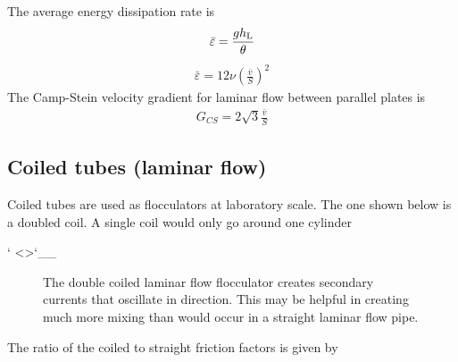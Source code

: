 \documentclass[letterpaper,10pt,english]{sphinxmanual}
\let\sphinxpxdimen\pdfpxdimen\else\newdimen\sphinxpxdimen
\begin{document}
The average energy dissipation rate is
\begin{equation}\label{equation:Rapid_Mix/RM_Derivations:Rapid_Mix/RM_Derivations:86}
\begin{split}\bar\varepsilon = \frac{gh_{\rm{L}}}{\theta}\end{split}
\end{equation}\begin{equation}\label{equation:Rapid_Mix/RM_Derivations:Rapid_Mix/RM_Derivations:87}
\begin{split}\bar\varepsilon = 12 \nu \left(\frac{  \bar v}{S} \right)^2\end{split}
\end{equation}
The Camp-Stein velocity gradient for laminar flow between parallel plates is
\begin{equation}\label{equation:Rapid_Mix/RM_Derivations:Rapid_Mix/RM_Derivations:88}
\begin{split}G_{CS} = 2\sqrt{3}\frac{  \bar v}{S}\end{split}
\end{equation}

\subsection{Coiled tubes (laminar flow)}
\label{\detokenize{Rapid_Mix/RM_Derivations:coiled-tubes-laminar-flow}}\label{\detokenize{Rapid_Mix/RM_Derivations:heading-coiled-tubes-laminar-flow}}
Coiled tubes are used as flocculators at laboratory scale. The one shown below is a doubled coil. A single coil would only go around one cylinder

{}` \textless{}\textgreater{}{}`\_\_

\begin{figure}[htbp]
\centering
\capstart

\noindent\sphinxincludegraphics[width=500\sphinxpxdimen]{{Coiled_tube_flocculator}.jpg}
\caption{The double coiled laminar flow flocculator creates secondary currents that oscillate in direction. This may be helpful in creating much more mixing than would occur in a straight laminar flow pipe.}\label{\detokenize{Rapid_Mix/RM_Derivations:id7}}\label{\detokenize{Rapid_Mix/RM_Derivations:figure-coiled-tube-flocculator}}\end{figure}

The ratio of the coiled to straight friction factors is given by 
\end{document}
